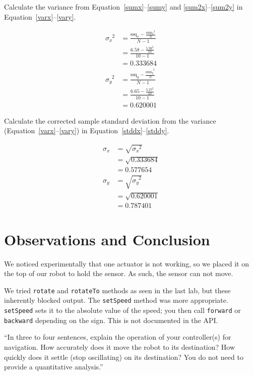 \documentclass[twocolumn]{article}
\begin{document}
Calculate the variance from Equation~\ref{sumx}--\ref{sumy} and \ref{sum2x}--\ref{sum2y} in Equation~\ref{varx}--\ref{vary}.

\begin{align}
\sigma_{x}^{\phantom{x}2} &= \frac{\text{ssq}_{x} - \frac{\text{sum}_{x}^{\phantom{x}2}}{N}}{N-1} \nonumber\\
 &= \frac{6.58 - \frac{5.98^2}{10}}{10-1} \nonumber\\
 &= 0.333684 \label{varx}\\
\sigma_{y}^{\phantom{y}2} &= \frac{\text{ssq}_{y} - \frac{\text{sum}_{y}^{\phantom{y}2}}{N}}{N-1} \nonumber\\
 &= \frac{6.65 - \frac{3.27^2}{10}}{10-1} \nonumber\\
 &= 0.620001 \label{vary}
\end{align}

Calculate the corrected sample standard deviation from the variance (Equation~\ref{varx}--\ref{vary}) in Equation~\ref{stddx}--\ref{stddy}.

\begin{align}
\sigma_x &= \sqrt{\sigma_{x}^{\phantom{x}2}} \nonumber\\
 &= \sqrt{0.333684} \nonumber\\
 &= 0.577654 \label{stddx}\\
\sigma_y &= \sqrt{\sigma_{y}^{\phantom{y}2}} \nonumber\\
 &= \sqrt{0.620001} \nonumber\\
 &= 0.787401 \label{stddy}
\end{align}

\section{Observations and Conclusion}

We noticed experimentally that one actuator is not working, so we placed it on the top of our robot to hold the sensor. As such, the sensor can not move.

We tried {\tt rotate} and {\tt rotateTo} methods as seen in the last lab\cite{alexneil2}, but these inherently blocked output. The {\tt setSpeed} method was more appropriate. {\tt setSpeed} sets it to the absolute value of the speed; you then call {\tt forward} or {\tt backward} depending on the sign. This is not documented in the API.

``In three to four sentences, explain the operation of your controller(s) for navigation. How accurately does it move the robot to its destination? How quickly does it settle (stop oscillating) on its destination? You do not need to provide a quantitative analysis.''
\end{document}
